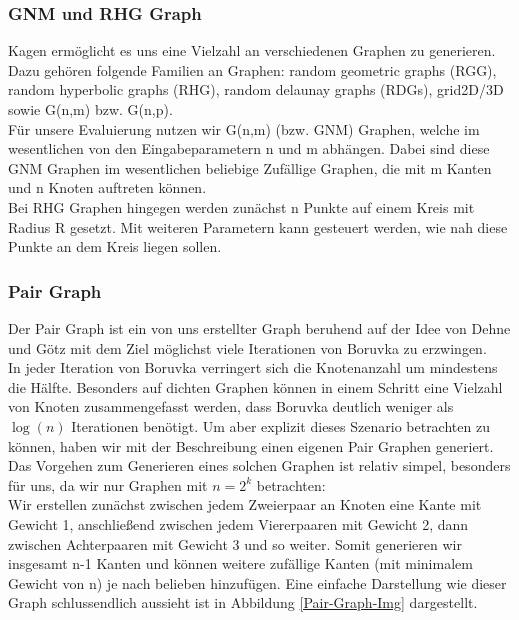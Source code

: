 \subsubsection{GNM und RHG Graph}
Kagen ermöglicht es uns eine Vielzahl an verschiedenen Graphen zu generieren. Dazu gehören folgende Familien an Graphen: random geometric graphs (RGG), random hyperbolic graphs (RHG), random delaunay graphs (RDGs), grid2D/3D sowie G(n,m) bzw. G(n,p). \\
Für unsere Evaluierung nutzen wir G(n,m) (bzw. GNM) Graphen, welche im wesentlichen von den Eingabeparametern n und m abhängen. Dabei sind diese GNM Graphen im wesentlichen beliebige Zufällige Graphen, die mit m Kanten und n Knoten auftreten können. \\
Bei RHG Graphen hingegen werden zunächst n Punkte auf einem Kreis mit Radius R gesetzt. Mit weiteren Parametern kann gesteuert werden, wie nah diese Punkte an dem Kreis liegen sollen. \\


\subsubsection{Pair Graph}
Der Pair Graph ist ein von uns erstellter Graph beruhend auf der Idee von Dehne und Götz \cite{dehne1998practical} mit dem Ziel möglichst viele Iterationen von Boruvka zu erzwingen.\\
In jeder Iteration von Boruvka verringert sich die Knotenanzahl um mindestens die Hälfte. Besonders auf dichten Graphen können in einem Schritt eine Vielzahl von Knoten zusammengefasst werden, dass Boruvka deutlich weniger als $\log(n)$ Iterationen benötigt. Um aber explizit dieses Szenario betrachten zu können, haben wir mit der Beschreibung  einen eigenen Pair Graphen generiert. \\

Das Vorgehen zum Generieren eines solchen Graphen ist relativ simpel, besonders für uns, da wir nur Graphen mit $n = 2^k$ betrachten: \\
Wir erstellen zunächst zwischen jedem Zweierpaar an Knoten eine Kante mit Gewicht 1, anschließend zwischen jedem Viererpaaren mit Gewicht 2, dann zwischen Achterpaaren mit Gewicht 3 und so weiter. Somit generieren wir insgesamt n-1 Kanten und können weitere zufällige Kanten (mit minimalem Gewicht von n) je nach belieben hinzufügen. Eine einfache Darstellung wie dieser Graph schlussendlich aussieht ist in Abbildung \cref{Pair-Graph-Img} dargestellt.\\

